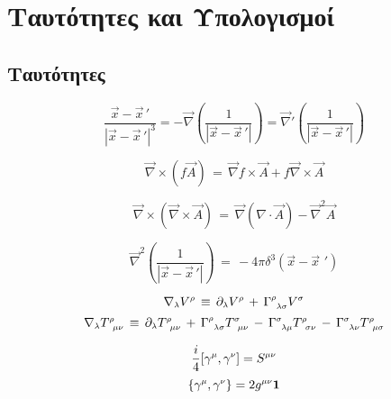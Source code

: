 \chapter{Ταυτότητες και Υπολογισμοί}
\section{Ταυτότητες}
\begin{equation}\label{apx_1}
    \frac{\Vec{x}-\Vec{x}\,'}{|\Vec{x}-\Vec{x}\,'|^3} =  -\vec{\nabla}\left(\frac{1}{|\Vec{x}-\Vec{x}\,'|}\right) = \vec{\nabla}'\left(\frac{1}{|\Vec{x}-\Vec{x}\,'|}\right)
\end{equation}

\begin{equation}\label{apx_2}
    \vec{\nabla}\times\left( f\vec{A} \right) \, = \, \vec{\nabla} f \times \vec{A} + f \vec{\nabla}\times\vec{A}
\end{equation}

\begin{equation}\label{apx_3}
    \vec{\nabla}\times\left(\vec{\nabla}\times\vec{A}\right) \, = \, \vec{\nabla}\left( \nabla\cdot\vec{A} \right) - \vec{\nabla}^2\vec{A}
\end{equation}

\begin{equation}\label{apx_4}
    \vec{\nabla}^2\left(\frac{1}{|\vec{x}-\vec{x}\,'|}\right) \, = \, -4\pi\delta^3(\vec{x}-\vec{x}\,\,')
\end{equation}

\begin{equation}
    \nabla\subscr{\lambda} V\superscr{\rho}\,\equiv\,\partial\subscr{\lambda} V\superscr{\rho}\,+\,\con{\rho}{\lambda}{\sigma} V\superscr{\sigma}
\end{equation}
\begin{equation}
    \nabla\subscr{\lambda} T\superscr{\rho}\subscr{\;\;\mu\nu} \,\equiv\,\partial\subscr{\lambda} T\superscr{\rho}\subscr{\;\;\mu\nu}\,+\,\con{\rho}{\lambda}{\sigma}T\superscr{\sigma}\subscr{\;\;\mu\nu} \,-\, \con{\sigma}{\lambda}{\mu}T\superscr{\rho}\subscr{\;\;\sigma\nu} \,-\, \con{\sigma}{\lambda}{\nu}T\superscr{\rho}\subscr{\;\;\mu\sigma}
\end{equation}

\begin{equation}\label{gamma matrix commutator}
    \frac{i}{4}[\gamma\superscr{\mu},\gamma\superscr{\nu}]=S\superscr{\mu\nu}
\end{equation}
\begin{equation}\label{gamma matrix anticommutator}
    \{\gamma\superscr{\mu},\gamma\superscr{\nu}\}=2g\superscr{\mu\nu}\mathbf{1}
\end{equation}

